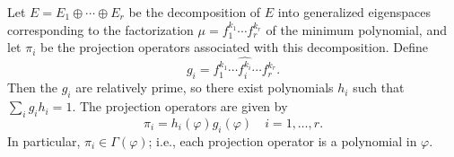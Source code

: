 Let $E = E_1 \oplus \cdots \oplus E_r$ be the decomposition of $E$ into generalized eigenspaces corresponding to the factorization $\mu = f_1^{k_1} \cdots f_r^{k_r}$ of the minimum polynomial, and let $\pi_i$ be the projection operators associated with this decomposition. Define
$$g_i = f_1^{k_1} \cdots \widehat{f_i^{k_i}} \cdots f_r^{k_r}.$$
Then the $g_i$ are relatively prime, so there exist polynomials $h_i$ such that $\sum_i g_i h_i = 1$. The projection operators are given by
$$\pi_i = h_i(\varphi) g_i(\varphi) \quad i = 1, \ldots, r.$$
In particular, $\pi_i \in \Gamma(\varphi)$; i.e., each projection operator is a polynomial in $\varphi$.
